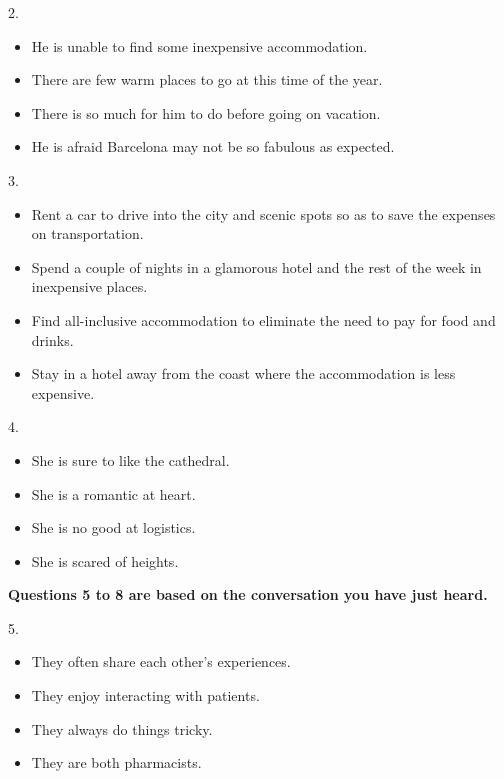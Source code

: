 \documentclass[UTF8,11pt]{ctexart}
\begin{document}
2.


\begin{itemize}[leftmargin=2em,itemsep=.2em,topsep=.4em]\item[A.] He is unable to find some inexpensive accommodation.
\item[B.] There are few warm places to go at this time of the year.
\item[C.] There is so much for him to do before going on vacation.
\item[D.] He is afraid Barcelona may not be so fabulous as expected.
\end{itemize}

3.


\begin{itemize}[leftmargin=2em,itemsep=.2em,topsep=.4em]\item[A.] Rent a car to drive into the city and scenic spots so as to save the expenses on transportation.
\item[B.] Spend a couple of nights in a glamorous hotel and the rest of the week in inexpensive places.
\item[C.] Find all-inclusive accommodation to eliminate the need to pay for food and drinks.
\item[D.] Stay in a hotel away from the coast where the accommodation is less expensive.
\end{itemize}

4.


\begin{itemize}[leftmargin=2em,itemsep=.2em,topsep=.4em]\item[A.] She is sure to like the cathedral.
\item[B.] She is a romantic at heart.
\item[C.] She is no good at logistics.
\item[D.] She is scared of heights.
\end{itemize}

\textbf{Questions 5 to 8 are based on the conversation you have just heard.}


5.


\begin{itemize}[leftmargin=2em,itemsep=.2em,topsep=.4em]\item[A.] They often share each other’s experiences.
\item[B.] They enjoy interacting with patients.
\item[C.] They always do things tricky.
\item[D.] They are both pharmacists.
\end{itemize}
\end{document}
